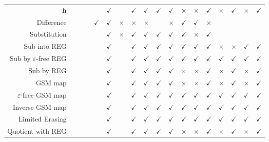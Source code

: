 \documentclass[letterpaper,10pt,oneside,landscape]{article}
\begin{document}
\begin{table}[tbph]
\begin{center}
\begin{tabular}{rcccc|ccccccccc|cccc}
        $\mathbf{h}$ & & & & & $\checkmark$ & & $\checkmark$ & $\checkmark$ & $\checkmark$ & $\checkmark$ & $\times$ & $\times$ & $\checkmark$ & $\times$ & $\checkmark$ & $\times$ & $\checkmark$\\
        Difference & & & & $\checkmark$ & $\checkmark$ & $\times$ & $\times$ & $\times$ & & $\times$ & $\checkmark$ & $\checkmark$ & $\times$\\
        Substitution & & & & & $\checkmark$ & $\times$ & $\checkmark$ & $\checkmark$ & $\checkmark$ & $\checkmark$ & $\checkmark$ & $\times$ & $\checkmark$\\
        Sub into REG & & & & & $\checkmark$ & & $\checkmark$ & $\checkmark$ & $\checkmark$ & $\checkmark$ & $\checkmark$ & $\checkmark$ & $\checkmark$ & $\times$ & $\times$ & $\checkmark$ & $\checkmark$\\
        Sub by $\varepsilon$-free REG & & & & & $\checkmark$ & & $\checkmark$ & $\checkmark$ & $\checkmark$ & $\checkmark$ & $\checkmark$ & $\checkmark$ & $\checkmark$ & $\checkmark$ & $\checkmark$ & $\checkmark$ & $\checkmark$\\
        Sub by REG & & & & & $\checkmark$ & & $\checkmark$ & $\checkmark$ & $\checkmark$ & $\checkmark$ & $\times$ & $\times$ & $\checkmark$ & $\times$ & $\checkmark$ & $\times$ & $\checkmark$\\
        GSM map & & & & & $\checkmark$ & & $\checkmark$ & $\checkmark$ & $\checkmark$ & $\checkmark$ & $\times$ & $\times$ & $\checkmark$ & $\times$ & $\checkmark$ & $\times$ & $\checkmark$\\
        $\varepsilon$-free GSM map & & & & & $\checkmark$ & & $\checkmark$ & $\checkmark$ & $\checkmark$ & $\checkmark$ & $\checkmark$ & $\checkmark$ & $\checkmark$ & $\checkmark$ & $\checkmark$ & $\checkmark$ & $\checkmark$\\
        Inverse GSM map & & & & & $\checkmark$ & & $\checkmark$ & $\checkmark$ & $\checkmark$ & $\checkmark$ & $\checkmark$ & $\checkmark$ & $\checkmark$ & $\checkmark$ & $\checkmark$ & $\checkmark$ & $\checkmark$\\
        Limited Erasing & & & & & $\checkmark$ & & $\checkmark$ & $\checkmark$ & $\checkmark$ & $\checkmark$ & $\checkmark$ & $\checkmark$ & $\checkmark$ & $\checkmark$ & $\checkmark$ & $\checkmark$ & $\checkmark$\\
        Quotient with REG & & & & & $\checkmark$ & & $\checkmark$ & $\checkmark$ & $\checkmark$ & $\checkmark$ & $\times$ & $\times$ & $\checkmark$ & $\times$ & $\checkmark$ & $\times$ & $\checkmark$\\

\end{tabular}
\end{center}
\end{table}
\end{document}
